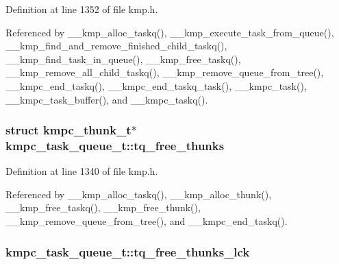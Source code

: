 Definition at line 1352 of file kmp.\-h.



Referenced by \-\_\-\-\_\-kmp\-\_\-alloc\-\_\-taskq(), \-\_\-\-\_\-kmp\-\_\-execute\-\_\-task\-\_\-from\-\_\-queue(), \-\_\-\-\_\-kmp\-\_\-find\-\_\-and\-\_\-remove\-\_\-finished\-\_\-child\-\_\-taskq(), \-\_\-\-\_\-kmp\-\_\-find\-\_\-task\-\_\-in\-\_\-queue(), \-\_\-\-\_\-kmp\-\_\-free\-\_\-taskq(), \-\_\-\-\_\-kmp\-\_\-remove\-\_\-all\-\_\-child\-\_\-taskq(), \-\_\-\-\_\-kmp\-\_\-remove\-\_\-queue\-\_\-from\-\_\-tree(), \-\_\-\-\_\-kmpc\-\_\-end\-\_\-taskq(), \-\_\-\-\_\-kmpc\-\_\-end\-\_\-taskq\-\_\-task(), \-\_\-\-\_\-kmpc\-\_\-task(), \-\_\-\-\_\-kmpc\-\_\-task\-\_\-buffer(), and \-\_\-\-\_\-kmpc\-\_\-taskq().

\hypertarget{structkmpc__task__queue__t_ae82f0066062ce0785b5407dcf19b6f5d}{
\subsubsection[{tq\-\_\-free\-\_\-thunks}]{\setlength{\rightskip}{0pt plus 5cm}struct {\bf kmpc\-\_\-thunk\-\_\-t}$\ast$ kmpc\-\_\-task\-\_\-queue\-\_\-t\-::tq\-\_\-free\-\_\-thunks}}\label{structkmpc__task__queue__t_ae82f0066062ce0785b5407dcf19b6f5d}


Definition at line 1340 of file kmp.\-h.



Referenced by \-\_\-\-\_\-kmp\-\_\-alloc\-\_\-taskq(), \-\_\-\-\_\-kmp\-\_\-alloc\-\_\-thunk(), \-\_\-\-\_\-kmp\-\_\-free\-\_\-taskq(), \-\_\-\-\_\-kmp\-\_\-free\-\_\-thunk(), \-\_\-\-\_\-kmp\-\_\-remove\-\_\-queue\-\_\-from\-\_\-tree(), and \-\_\-\-\_\-kmpc\-\_\-end\-\_\-taskq().

\hypertarget{structkmpc__task__queue__t_ac4b6aeafed0e9174aeb3706880b5bc56}{
\subsubsection[{tq\-\_\-free\-\_\-thunks\-\_\-lck}]{ kmpc\-\_\-task\-\_\-queue\-\_\-t\-::tq\-\_\-free\-\_\-thunks\-\_\-lck}}\label{structkmpc__task__queue__t_ac4b6aeafed0e9174aeb3706880b5bc56}


